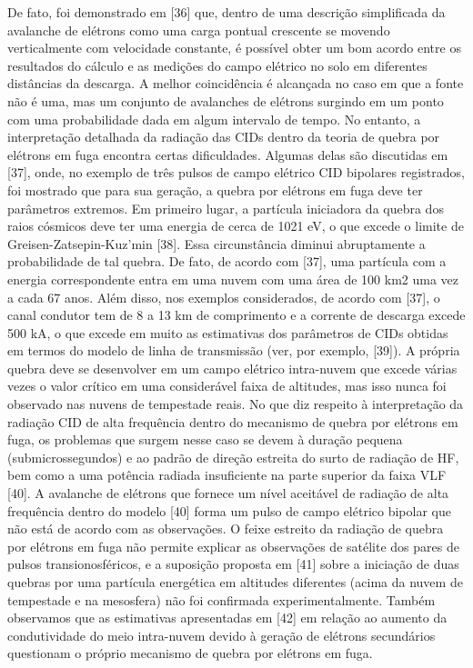 \documentclass[a4paper, 12pt, onecolumn,singlespacing]{article}
\begin{document}
	De fato, foi demonstrado em [36] que, dentro de uma descrição simplificada da avalanche de elétrons como uma carga pontual crescente se movendo verticalmente com velocidade constante, é possível obter um bom acordo entre os resultados do cálculo e as medições do campo elétrico no solo em diferentes distâncias da descarga. A melhor coincidência é alcançada no caso em que a fonte não é uma, mas um conjunto de avalanches de elétrons surgindo em um ponto com uma probabilidade dada em algum intervalo de tempo. No entanto, a interpretação detalhada da radiação das CIDs dentro da teoria de quebra por elétrons em fuga encontra certas dificuldades. Algumas delas são discutidas em [37], onde, no exemplo de três pulsos de campo elétrico CID bipolares registrados, foi mostrado que para sua geração, a quebra por elétrons em fuga deve ter parâmetros extremos. Em primeiro lugar, a partícula iniciadora da quebra dos raios cósmicos deve ter uma energia de cerca de 1021 eV, o que excede o limite de Greisen-Zatsepin-Kuz'min [38]. Essa circunstância diminui abruptamente a probabilidade de tal quebra. De fato, de acordo com [37], uma partícula com a energia correspondente entra em uma nuvem com uma área de 100 km2 uma vez a cada 67 anos. Além disso, nos exemplos considerados, de acordo com [37], o canal condutor tem de 8 a 13 km de comprimento e a corrente de descarga excede 500 kA, o que excede em muito as estimativas dos parâmetros de CIDs obtidas em termos do modelo de linha de transmissão (ver, por exemplo, [39]). A própria quebra deve se desenvolver em um campo elétrico intra-nuvem que excede várias vezes o valor crítico em uma considerável faixa de altitudes, mas isso nunca foi observado nas nuvens de tempestade reais. No que diz respeito à interpretação da radiação CID de alta frequência dentro do mecanismo de quebra por elétrons em fuga, os problemas que surgem nesse caso se devem à duração pequena (submicrossegundos) e ao padrão de direção estreita do surto de radiação de HF, bem como a uma potência radiada insuficiente na parte superior da faixa VLF [40]. A avalanche de elétrons que fornece um nível aceitável de radiação de alta frequência dentro do modelo [40] forma um pulso de campo elétrico bipolar que não está de acordo com as observações. O feixe estreito da radiação de quebra por elétrons em fuga não permite explicar as observações de satélite dos pares de pulsos transionosféricos, e a suposição proposta em [41] sobre a iniciação de duas quebras por uma partícula energética em altitudes diferentes (acima da nuvem de tempestade e na mesosfera) não foi confirmada experimentalmente. Também observamos que as estimativas apresentadas em [42] em relação ao aumento da condutividade do meio intra-nuvem devido à geração de elétrons secundários questionam o próprio mecanismo de quebra por elétrons em fuga.
	
\end{document}
